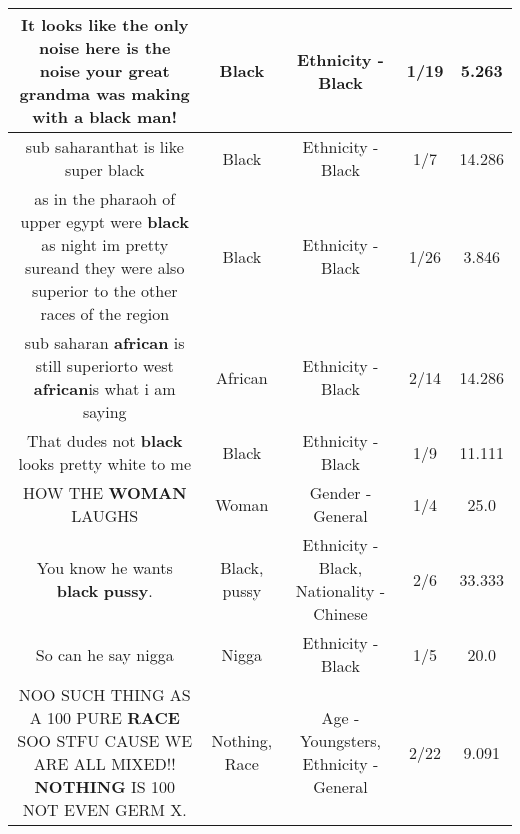 \documentclass[11pt]{article}
\newlength\mylength
\begin{document}
\begin{center}
\begin{longtable}{|C{.65\mylength}|C{.30\mylength}|C{.12\mylength}|C{.12\mylength}|C{.12\mylength}|}
  \small It looks like the only noise here is the noise your great grandma was making with a \textbf{black} man!\normalsize   & Black & Ethnicity - Black & 1/19 & 5.263 \\  \hline
  \small sub saharanthat is like super black\normalsize   & Black & Ethnicity - Black & 1/7 & 14.286 \\  \hline
  \small as in the pharaoh of upper egypt were \textbf{black} as night im pretty sureand they were also superior to the other races of the region\normalsize   & Black & Ethnicity - Black & 1/26 & 3.846 \\  \hline
  \small sub saharan \textbf{african} is still superiorto west \textbf{african}is what i am saying\normalsize   & African & Ethnicity - Black & 2/14 & 14.286 \\  \hline
  \small That dudes not \textbf{black} looks pretty white to me\normalsize   & Black & Ethnicity - Black & 1/9 & 11.111 \\  \hline
  \small HOW THE \textbf{WOMAN} LAUGHS\normalsize   & Woman & Gender - General & 1/4 & 25.0 \\  \hline
  \small You know he wants \textbf{black} \textbf{pussy}.\normalsize   & Black, pussy & Ethnicity - Black, Nationality - Chinese & 2/6 & 33.333 \\  \hline
  \small So can he say nigga\normalsize   & Nigga & Ethnicity - Black & 1/5 & 20.0 \\  \hline
  \small NOO SUCH THING AS A 100 PURE \textbf{RACE} SOO STFU CAUSE WE ARE ALL MIXED!! \textbf{NOTHING} IS 100 NOT EVEN GERM X.\normalsize   & Nothing, Race & Age - Youngsters, Ethnicity - General & 2/22 & 9.091 \\  \hline

\end{longtable}
\end{center}
\end{document}
